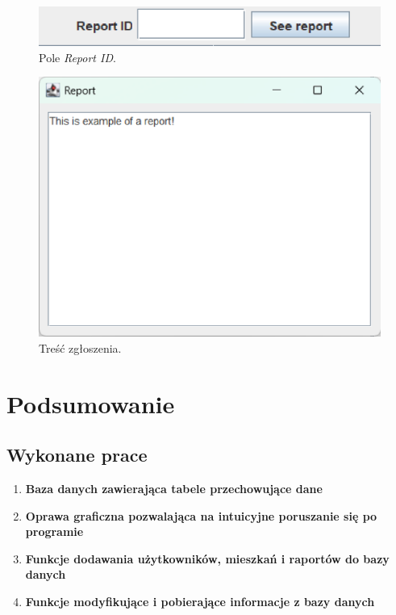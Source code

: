\begin{figure}[H]
    \centering
    \includegraphics[width=\textwidth,height=0.15\textheight,keepaspectratio]{figures/app-images/admin-panel-report.eps}
    \caption{Pole \textit{Report ID}.\label{fig21}}
\end{figure}

\begin{figure}[H]
    \centering
    \includegraphics[width=\textwidth,height=0.3\textheight,keepaspectratio]{figures/app-images/see-report.eps}
    \caption{Treść zgłoszenia.\label{fig22}}
\end{figure}
\chapter{Podsumowanie}
\section{Wykonane prace}
\begin{enumerate}
    \item \textbf{Baza danych zawierająca tabele przechowujące dane}
    \item \textbf{Oprawa graficzna pozwalająca na intuicyjne poruszanie się po programie}
    \item \textbf{Funkcje dodawania użytkowników, mieszkań i raportów do bazy danych}
    \item \textbf{Funkcje modyfikujące i pobierające informacje z bazy danych}
\end{enumerate}
